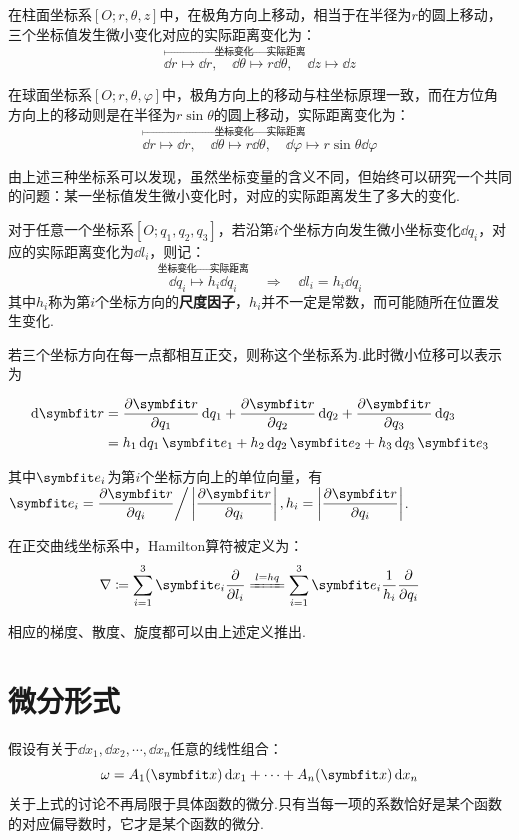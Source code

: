 在柱面坐标系$[O;r,\theta,z]$中，在极角方向上移动，相当于在半径为$r$的圆上移动，三个坐标值发生微小变化对应的实际距离变化为：
\[\overset{\text{坐标变化}\,\longmapsto\,\text{实际距离}}{\dd{r}\mapsto\dd{r},\quad\dd{\theta}\mapsto r\dd{\theta},\quad\dd{z}\mapsto\dd{z}}\]

在球面坐标系$[O;r,\theta,\varphi]$中，极角方向上的移动与柱坐标原理一致，而在方位角方向上的移动则是在半径为$r \sin\theta$的圆上移动，实际距离变化为：
\[\overset{\text{坐标变化}\,\longmapsto\,\text{实际距离}}{\dd{r}\mapsto\dd{r},\quad\dd{\theta}\mapsto r\dd{\theta},\quad\dd{\varphi}\mapsto r\sin\theta\dd{\varphi}}\]

由上述三种坐标系可以发现，虽然坐标变量的含义不同，但始终可以研究一个共同的问题：某一坐标值发生微小变化时，对应的实际距离发生了多大的变化.

对于任意一个坐标系$[O;q_1,q_2,q_3]$，若沿第$i$个坐标方向发生微小坐标变化$\dd{q_i}$，对应的实际距离变化为$\dd{l_i}$，则记：
\[\overset{\text{坐标变化}\,\longmapsto\,\text{实际距离}}{\dd{q_i}\mapsto h_i\dd{q_i}} \quad\Rightarrow\quad \dd{l_i}=h_i\dd{q_i}\]
其中$h_i$称为第$i$个坐标方向的\textbf{尺度因子}，$h_i$并不一定是常数，而可能随所在位置发生变化.

若三个坐标方向在每一点都相互正交，则称这个坐标系为.此时微小位移可以表示为

\begin{align*}
    \dd{\vb r} &= \pdv{\vb{r}}{q_1}\dd{q_1} + \pdv{\vb{r}}{q_2}\dd{q_2} + \pdv{\vb{r}}{q_3}\dd{q_3} \\
    &= h_1\dd{q_1}\vb e_1+h_2\dd{q_2}\vb e_2+h_3\dd{q_3}\vb e_3
\end{align*}

其中$\vb e_i$为第$i$个坐标方向上的单位向量，有$\displaystyle\vb{e}_i = \pdv{\vb{r}}{q_i}\bigg/\left|\pdv{\vb{r}}{q_i}\right|,h_i = \left|\pdv{\vb{r}}{q_i}\right|$.

\begin{definition}
    在正交曲线坐标系中，Hamilton算符被定义为：
    \[\nabla \coloneq  \sum_{i=1}^{3}\vb{e}_i\pdv{l_i} \xlongequal{l = hq} \sum_{i=1}^{3}\vb{e}_i \frac{1}{h_i} \pdv{q_i}\]
\end{definition}
相应的梯度、散度、旋度都可以由上述定义推出.


\section{微分形式}
假设有关于$\dd{x_1},\dd{x_2},\cdots,\dd{x_n}$任意的线性组合：
\[\omega = A_1(\vb{x})\dd{x_1} + \cdots + A_n(\vb{x})\dd{x_n}\]
关于上式的讨论不再局限于具体函数的微分.只有当每一项的系数恰好是某个函数的对应偏导数时，它才是某个函数的微分.


